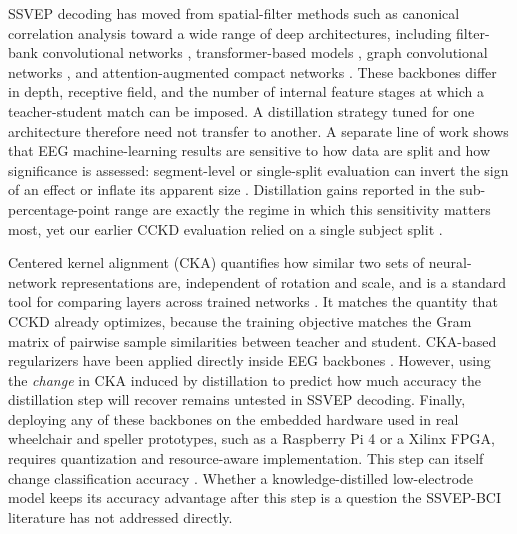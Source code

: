 \documentclass[11pt,a4paper,twoside,asymmetric]{article}
\begin{document}
SSVEP decoding has moved from spatial-filter methods such as canonical correlation analysis toward a wide range of deep architectures, including filter-bank convolutional networks \cite{R16}, transformer-based models \cite{R15,R23}, graph convolutional networks \cite{R18}, and attention-augmented compact networks \cite{R19,R20,R21,R26,R29}. These backbones differ in depth, receptive field, and the number of internal feature stages at which a teacher-student match can be imposed. A distillation strategy tuned for one architecture therefore need not transfer to another. A separate line of work shows that EEG machine-learning results are sensitive to how data are split and how significance is assessed: segment-level or single-split evaluation can invert the sign of an effect or inflate its apparent size \cite{R75,R76,R77,R78,R79,R80,R81}. Distillation gains reported in the sub-percentage-point range are exactly the regime in which this sensitivity matters most, yet our earlier CCKD evaluation relied on a single subject split \cite{R82}.

Centered kernel alignment (CKA) quantifies how similar two sets of neural-network representations are, independent of rotation and scale, and is a standard tool for comparing layers across trained networks \cite{R73,R74,R71,R72}. It matches the quantity that CCKD already optimizes, because the training objective matches the Gram matrix of pairwise sample similarities between teacher and student. CKA-based regularizers have been applied directly inside EEG backbones \cite{R70}. However, using the \emph{change} in CKA induced by distillation to predict how much accuracy the distillation step will recover remains untested in SSVEP decoding. Finally, deploying any of these backbones on the embedded hardware used in real wheelchair and speller prototypes, such as a Raspberry Pi 4 or a Xilinx FPGA, requires quantization and resource-aware implementation. This step can itself change classification accuracy \cite{R58,R60,R62,R63}. Whether a knowledge-distilled low-electrode model keeps its accuracy advantage after this step is a question the SSVEP-BCI literature has not addressed directly.
\end{document}
